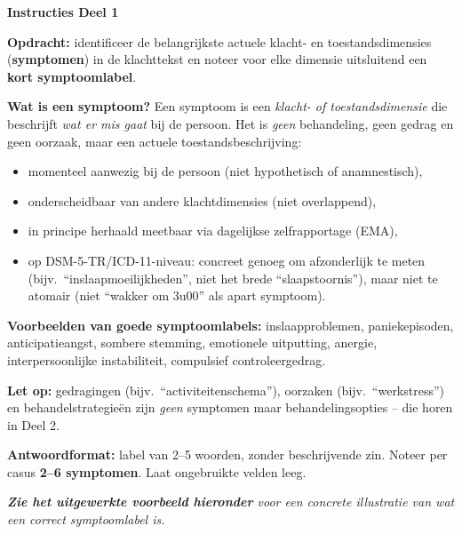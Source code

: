 \documentclass[11pt,a4paper]{article}
\begin{document}
\begin{tcolorbox}[colback=blue!3,colframe=PrimaryBlue,arc=2.5mm,boxrule=0.9pt,
  left=10pt,right=10pt,top=9pt,bottom=9pt]
\textbf{\color{PrimaryBlue}Instructies Deel 1}

\smallskip\small
\textbf{Opdracht:} identificeer de belangrijkste actuele klacht- en toestandsdimensies
(\textbf{symptomen}) in de klachttekst en noteer voor elke dimensie uitsluitend een
\textbf{kort symptoomlabel}.

\textbf{Wat is een symptoom?}
Een symptoom is een \emph{klacht- of toestandsdimensie} die beschrijft \emph{wat er
mis gaat} bij de persoon. Het is \emph{geen} behandeling, geen gedrag en geen oorzaak,
maar een actuele toestandsbeschrijving:
\begin{itemize}[topsep=2pt,itemsep=1pt]
\item momenteel aanwezig bij de persoon (niet hypothetisch of anamnestisch),
\item onderscheidbaar van andere klachtdimensies (niet overlappend),
\item in principe herhaald meetbaar via dagelijkse zelfrapportage (EMA),
\item op DSM-5-TR/ICD-11-niveau: concreet genoeg om afzonderlijk te meten (bijv.\ ``inslaapmoeilijkheden'', niet het brede ``slaapstoornis''), maar niet te atomair (niet ``wakker om 3u00'' als apart symptoom).
\end{itemize}

\textbf{Voorbeelden van goede symptoomlabels:}
inslaapproblemen, paniekepisoden, anticipatieangst, sombere stemming, emotionele uitputting,
anergie, interpersoonlijke instabiliteit, compulsief controleergedrag.

\textbf{Let op:} gedragingen (bijv.\ ``activiteitenschema''), oorzaken (bijv.\ ``werkstress'')
en behandelstrategieën zijn \emph{geen} symptomen maar behandelingsopties -- die horen in Deel 2.

\textbf{Antwoordformat:} label van 2--5 woorden, zonder beschrijvende zin.
Noteer per casus \textbf{2--6 symptomen}. Laat ongebruikte velden leeg.

\medskip
\textit{\textbf{Zie het uitgewerkte voorbeeld hieronder} voor een concrete illustratie van wat een correct symptoomlabel is.}
\end{tcolorbox}

\vspace{0.5em}
\nopagebreak[4]
\end{document}
